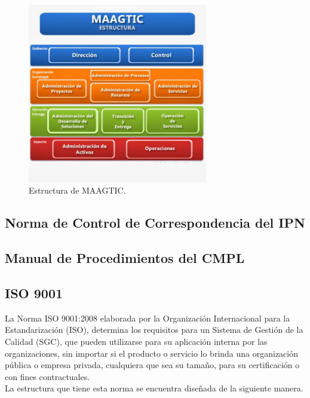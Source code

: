 	\begin{figure}[htbp!]
		\centering
			\includegraphics[width=0.7\textwidth]{images/antecedentes/MAAGTICSI.jpg}
		\caption{Estructura de MAAGTIC\cite{MAAGTICSIEstructura}.}
		\label{fig:MAAGTIC}
	\end{figure}
	
	
	
	\subsection{Norma de Control de Correspondencia del IPN}
	
	\subsection{Manual de Procedimientos del CMPL}
	
	\subsection{ISO 9001}
	La Norma ISO 9001:2008 elaborada por la Organización Internacional para la Estandarización (ISO), determina los requisitos para un Sistema de Gestión de la Calidad (SGC), que pueden utilizarse para su aplicación interna por las organizaciones, sin importar si el producto o servicio lo brinda una organización pública o empresa privada, cualquiera que sea su tamaño, para su certificación o con fines contractuales.\\
	
	La estructura que tiene esta norma se encuentra diseñada de la siguiente manera.\\
	
